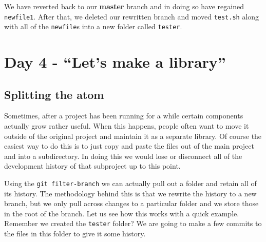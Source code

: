 
We have reverted back to our \textbf{master} branch and in doing so have regained \texttt{newfile1}.
After that, we deleted our rewritten branch and moved \texttt{test.sh} along with all of the \texttt{newfile}s into a new folder called \texttt{tester}.

\section{Day 4 - ``Let's make a library''}
\subsection{Splitting the atom}
Sometimes, after a project has been running for a while certain components actually grow rather useful.
When this happens, people often want to move it outside of the original project and maintain it as a separate library.
Of course the easiest way to do this is to just copy and paste the files out of the main project and into a subdirectory.
In doing this we would lose or disconnect all of the development history of that subproject up to this point.

Using the \texttt{git filter-branch} we can actually pull out a folder and retain all of its history.
The methodology behind this is that we rewrite the history to a new branch, but we only pull across changes to a particular folder and we store those in the root of the branch.
Let us see how this works with a quick example.
Remember we created the \texttt{tester} folder?
We are going to make a few commits to the files in this folder to give it some history.


